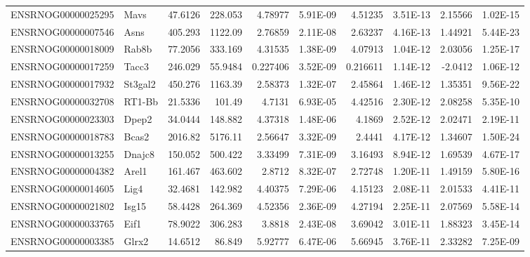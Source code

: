 \begin{sidewaystable}[]
\begin{tabular}{llrrrrrrrr}
ENSRNOG00000025295 & Mavs     & 47.6126      & 228.053      & 4.78977    & 5.91E-09   & 4.51235      & 3.51E-13   & 2.15566     & 1.02E-15     \\
ENSRNOG00000007546 & Asns     & 405.293      & 1122.09      & 2.76859    & 2.11E-08   & 2.63237      & 4.16E-13   & 1.44921     & 5.44E-23     \\
ENSRNOG00000018009 & Rab8b    & 77.2056      & 333.169      & 4.31535    & 1.38E-09   & 4.07913      & 1.04E-12   & 2.03056     & 1.25E-17     \\
ENSRNOG00000017259 & Tacc3    & 246.029      & 55.9484      & 0.227406   & 3.52E-09   & 0.216611     & 1.14E-12   & -2.0412     & 1.06E-12     \\
ENSRNOG00000017932 & St3gal2  & 450.276      & 1163.39      & 2.58373    & 1.32E-07   & 2.45864      & 1.46E-12   & 1.35351     & 9.56E-22     \\
ENSRNOG00000032708 & RT1-Bb   & 21.5336      & 101.49       & 4.7131     & 6.93E-05   & 4.42516      & 2.30E-12   & 2.08258     & 5.35E-10     \\
ENSRNOG00000023303 & Dpep2    & 34.0444      & 148.882      & 4.37318    & 1.48E-06   & 4.1869       & 2.52E-12   & 2.02471     & 2.19E-11     \\
ENSRNOG00000018783 & Bcas2    & 2016.82      & 5176.11      & 2.56647    & 3.32E-09   & 2.4441       & 4.17E-12   & 1.34607     & 1.50E-24     \\
ENSRNOG00000013255 & Dnajc8   & 150.052      & 500.422      & 3.33499    & 7.31E-09   & 3.16493      & 8.94E-12   & 1.69539     & 4.67E-17     \\
ENSRNOG00000004382 & Arel1    & 161.467      & 463.602      & 2.8712     & 8.32E-07   & 2.72748      & 1.20E-11   & 1.49159     & 5.80E-16     \\
ENSRNOG00000014605 & Lig4     & 32.4681      & 142.982      & 4.40375    & 7.29E-06   & 4.15123      & 2.08E-11   & 2.01533     & 4.41E-11     \\
ENSRNOG00000021802 & Isg15    & 58.4428      & 264.369      & 4.52356    & 2.36E-09   & 4.27194      & 2.25E-11   & 2.07569     & 5.58E-14     \\
ENSRNOG00000033765 & Eif1     & 78.9022      & 306.283      & 3.8818     & 2.43E-08   & 3.69042      & 3.01E-11   & 1.88323     & 3.45E-14     \\
ENSRNOG00000003385 & Glrx2    & 14.6512      & 86.849       & 5.92777    & 6.47E-06   & 5.66945      & 3.76E-11   & 2.33282     & 7.25E-09     \\

\end{tabular}
\end{sidewaystable}
